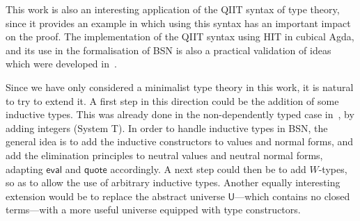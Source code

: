 \documentclass[a4paper,UKenglish,cleveref]{lipics-v2019}
\newcommand{\agdaSymb}[1]{\mathsf{#1}}
\newcommand{\eval}{\agdaSymb{eval}}
\newcommand{\q}{\agdaSymb{quote}}
\newcommand{\U}{\agdaSymb{U}}
\begin{document}
This work is also an interesting application of the QIIT syntax of type theory,
since it provides an example in which using this syntax has an important impact
on the proof. The implementation of the QIIT syntax using HIT in cubical Agda,
and its use in the formalisation of BSN is also a practical validation of
ideas which were developed in~\cite{kaposi2016type}.

Since we have only considered a minimalist type theory in this work, it is
natural to try to extend it.
A first step in this direction could be the addition of some inductive types.
This was already done in the non-dependently typed case
in~\cite{chapman2009bsn}, by adding integers (System T).
In order to handle inductive types in BSN, the general idea is to add the
inductive constructors to values and normal forms, and add the elimination principles to
neutral values and neutral normal forms, adapting $\eval$ and $\q$ accordingly.
A next step could then be to add $W$-types, so as to allow the use of
arbitrary inductive types.
Another equally interesting extension would be to replace the abstract
universe $\U$---which contains no closed terms---with a more useful universe
equipped with type constructors.


\end{document}
